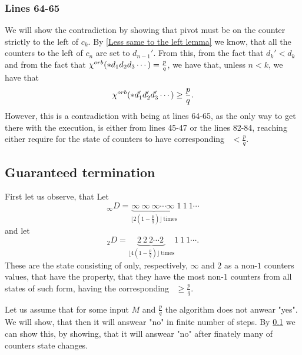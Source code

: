 \subsubsection{Lines 64-65}
We will show the contradiction by showing that pivot must be on 
the counter strictly to the left of $c_k$. 
By \ref{Less same to the left lemma} 
we know, that all the counters to the left of $c_n$ are set to $d_{n-1}'$. 
From this, from the fact that $d_k' < d_k$ and 
from the fact that ${\chi^{orb}(*d_1d_2d_3\cdots)} = \frac{p}{q}$, 
we have that, unless $n < k$, we have that 
\begin{equation}
{\chi^{orb}(*d_1'd_2'd_3'\cdots)} \geq \frac{p}{q}.
\end{equation}
However, this is a contradiction with being at lines 64-65, as 
the only way to get there with the execution, is either from lines 
45-47 or the lines 82-84, reaching either require for the state of counters to have 
corresponding \Eoc\ $<\frac{p}{q}$.


\subsection{Guaranteed termination}
First let us observe, that 
Let 
\begin{equation}
_\infty D = \underbrace{\infty\ \infty\ \infty\cdots 
\infty\ }_{\lfloor 2(1-\frac{p}{q})\rfloor\ \mathrm{times}}1\ 1\ 1\cdots
\end{equation}
and let 
\begin{equation}
_2D = \underbrace{2\ 2\ 2\cdots 
2\ }_{\lfloor 4(1-\frac{p}{q})\rfloor\ \mathrm{times}}1\ 1\ 1\cdots.
\end{equation}
These are the state consisting of only, respectively, $\infty$ and $2$ as a non-$1$ counters 
values, that have the property, that they have the most non-$1$ counters from all 
states of such form, having the corresponding \Eoc\ $\geq\frac{p}{q}$. 

Let us assume that for some input $M$ and $\frac{p}{q}$ the algorithm does not anwear "yes". 
We will show, that then it will answear "no" in finite number of steps. By \ref{} 
we can show this, by showing, that it will answear "no" after 
finately many of counters state changes. 
